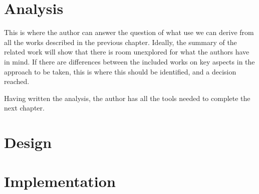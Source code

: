 \documentclass[ twoside,openright,titlepage,numbers=noenddot,headinclude,%
                footinclude=true,cleardoublepage=empty,abstractoff, %
                BCOR=5mm,paper=a4,fontsize=11pt,%
                ngerman,american,%
                ]{scrreprt}
\begin{document}
\chapter{Analysis}
\label{cha:analysis}

This is where the author can answer the question of what use we can
derive from all the works described in the previous chapter. Ideally,
the summary of the related work will show that there is room
unexplored for what the authors have in mind. If there are differences
between the included works on key aspects in the approach to be taken,
this is where this should be identified, and a decision reached.

Having written the analysis, the author has all the tools needed to
complete the next chapter.


\chapter{Design}
\label{cha:design}

%
%





\chapter{Implementation}
\label{cha:implementation}
\end{document}
